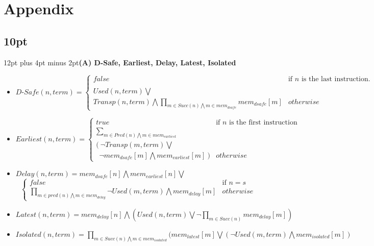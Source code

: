 \documentclass[onecolumn,10pt]{journal}
\begin{document}
\pagebreak
\section{Appendix}

\titlespacing\subsection*{10pt}{12pt plus 4pt minus 2pt}\textbf{(A) D-Safe, Earliest, Delay, Latest, Isolated}
\begin{itemize}
\item $
D\text{-}Safe(n, term) = 
\begin{cases}
false & \text{if } n\text{ is the last instruction.} \\
\\
Used(n, term) \bigvee \\
Transp(n, term) \bigwedge \prod\limits_{m \in Succ(n) \bigwedge m \in mem_{dsafe}}mem_{dsafe}[m] & otherwise
\end{cases}
$

\item $
Earliest(n, term) = \begin{cases}
true & \text{if }n\text{ is the first instruction} \\
\sum\limits_{m \in Pred(n) \bigwedge m \in mem_{earliest}} \\
(\ \neg Transp(m, term) \bigvee \\
\ \ \neg mem_{dsafe}[m] \bigwedge mem_{earliest}[m]\ ) & otherwise
\end{cases}
$

\item $Delay(n, term) = mem_{dsafe}[n] \bigwedge mem_{earliest}[n] \bigvee$
$$\begin{cases}
false & \text{if }n = s \\
\prod\limits_{m\in pred(n) \bigwedge m \in mem_{delay}} \neg Used(m, term) \bigwedge mem_{delay}[m] & otherwise
\end{cases}$$

\item $Latest(n, term) = mem_{delay}[n] \bigwedge (Used(n, term) \bigvee \neg \prod\limits_{m \in Succ(n)} mem_{delay}[m]) $

\item $Isolated(n, term) = \prod\limits_{m \in Succ(n) \bigwedge m \in mem_{isolated}}(mem_{latest}[m] \bigvee (\neg Used(m, term) \bigwedge mem_{isolated}[m])$


\end{itemize}
\end{document}
